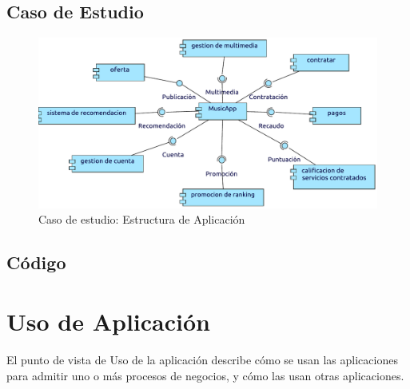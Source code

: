 \subsection{Caso de Estudio}

\begin{figure}[h!]
	\centering
	\includegraphics[width=\linewidth]{Arquitectura/Aplicacion/imgs/estructura.pdf}
	\caption{Caso de estudio: Estructura de Aplicación }
\end{figure}


\subsection{Código}









\newpage

\section{Uso de Aplicación}

El punto de vista de Uso de la aplicación describe cómo se usan las aplicaciones para admitir uno o más procesos de negocios, y cómo las usan otras aplicaciones. \vspace{\baselineskip}

